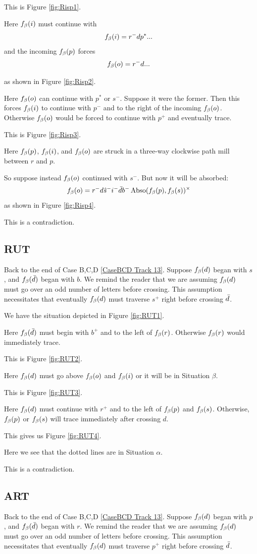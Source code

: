 This is Figure \ref{fig:Risp1}.

Here $f_\beta(i)$ must continue with
\[
f_\beta(i) = r^- d p^*...
\]
and the incoming $f_\beta(p)$ forces
\[
f_\beta(o) = r^- d...
\]

as shown in Figure \ref{fig:Risp2}.

Here $f_\beta(o)$ can continue with $p^*$ or $s^-$. Suppose it were the former. Then this forces $f_\beta(i)$ to continue with $p^-$ and to the right of the incoming $f_\beta(o)$. Otherwise $f_\beta(o)$ would be forced to continue with $p^+$ and eventually trace. 

This is Figure \ref{fig:Risp3}.

Here $f_\beta(p)$, $f_\beta(i)$, and $f_\beta(o)$ are struck in a three-way clockwise path mill between $r$ and $p$. 

So suppose instead $f_\beta(o)$ continued with $s^-$. But now it will be absorbed:
\[
f_\beta(o) = r^- d \hat{s}^- i^- \bar{d} b^- \operatorname{Abso}(f_\beta(p), f_\beta(s))^\times
\]
as shown in Figure \ref{fig:Risp4}.

This is a contradiction.

\subsection{RUT}\label{RUT}
Back to the end of Case B,C,D \ref{CaseBCD Track 13}.
Suppose $f_\beta(d)$ began with $s$, and $f_\beta(\bar{d})$ began with $b$. We remind the reader that we are assuming $f_\beta(d)$ must go over an odd number of letters before crossing. This assumption necessitates that eventually $f_\beta(d)$ must traverse $s^+$ right before crossing $\bar{d}$.


We have the situation depicted in Figure \ref{fig:RUT1}.

Here $f_\beta(\bar{d})$ must begin with $b^+$ and to the left of $f_\beta(r)$. Otherwise $f_\beta(r)$ would immediately trace.

This is Figure \ref{fig:RUT2}.

Here $f_\beta(d)$ must go above $f_\beta(o)$ and $f_\beta(i)$ or it will be in Situation $\beta$. 

This is Figure \ref{fig:RUT3}.

Here $f_\beta(d)$ must continue with $r^+$ and to the left of $f_\beta(p)$ and $f_\beta(s)$. Otherwise, $f_\beta(p)$ or $f_\beta(s)$ will trace immediately after crossing $d$. 

This gives us Figure \ref{fig:RUT4}.

Here we see that the dotted lines are in Situation $\alpha$.

This is a contradiction.

\subsection{ART}\label{ART}
Back to the end of Case B,C,D \ref{CaseBCD Track 13}.
Suppose $f_\beta(d)$ began with $p$, and $f_\beta(\bar{d})$ began with $r$. We remind the reader that we are assuming $f_\beta(d)$ must go over an odd number of letters before crossing. This assumption necessitates that eventually $f_\beta(d)$ must traverse $p^+$ right before crossing $\bar{d}$.


